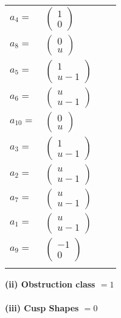 \documentclass[1p]{elsarticle_modified}
\theoremstyle{definition}
\begin{document}
\begin{tabular}{m{7pt} m{180pt} m{7pt} m{180pt} }
\flushright $a_{4}=$&$\begin{pmatrix}1\\0\end{pmatrix}$ \\
\flushright $a_{8}=$&$\begin{pmatrix}0\\u\end{pmatrix}$ \\
\flushright $a_{5}=$&$\begin{pmatrix}1\\u-1\end{pmatrix}$ \\
\flushright $a_{6}=$&$\begin{pmatrix}u\\u-1\end{pmatrix}$ \\
\flushright $a_{10}=$&$\begin{pmatrix}0\\u\end{pmatrix}$ \\
\flushright $a_{3}=$&$\begin{pmatrix}1\\u-1\end{pmatrix}$ \\
\flushright $a_{2}=$&$\begin{pmatrix}u\\u-1\end{pmatrix}$ \\
\flushright $a_{7}=$&$\begin{pmatrix}u\\u-1\end{pmatrix}$ \\
\flushright $a_{1}=$&$\begin{pmatrix}u\\u-1\end{pmatrix}$ \\
\flushright $a_{9}=$&$\begin{pmatrix}-1\\0\end{pmatrix}$\\&\end{tabular}
\flushleft \textbf{(ii) Obstruction class $= 1$}\\~\\
\flushleft \textbf{(iii) Cusp Shapes $= 0$}\\~\\
\end{document}
